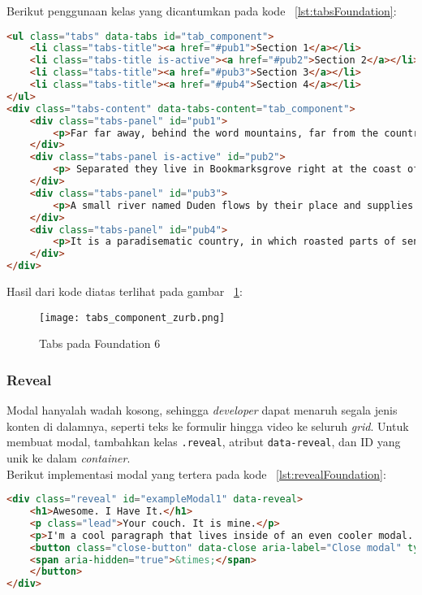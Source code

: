 \noindent Berikut penggunaan kelas yang dicantumkan pada kode ~\ref{lst:tabsFoundation}:
\begin{lstlisting}[style=customhtml, language=HTML,  basicstyle=\ttfamily, frame=single, columns=fullflexible, keepspaces=true, breaklines=true, showstringspaces=false, label={lst:tabsFoundation}, caption=Tabs pada foundation 6.] 
<ul class="tabs" data-tabs id="tab_component">
	<li class="tabs-title"><a href="#pub1">Section 1</a></li>
	<li class="tabs-title is-active"><a href="#pub2">Section 2</a></li>
	<li class="tabs-title"><a href="#pub3">Section 3</a></li>
	<li class="tabs-title"><a href="#pub4">Section 4</a></li>
</ul>
<div class="tabs-content" data-tabs-content="tab_component">
	<div class="tabs-panel" id="pub1">
		<p>Far far away, behind the word mountains, far from the countries Vokalia and Consonantia, there live the blind texts.</p>
	</div>
	<div class="tabs-panel is-active" id="pub2">
		<p> Separated they live in Bookmarksgrove right at the coast of the	Semantics, a large language ocean. </p>
	</div>
	<div class="tabs-panel" id="pub3">
		<p>A small river named Duden flows by their place and supplies it with the necessary regelialia.</p>
	</div>
	<div class="tabs-panel" id="pub4">
		<p>It is a paradisematic country, in which roasted parts of sentences fly into your mouth. </p>
	</div>
</div>
\end{lstlisting}

\noindent Hasil dari kode diatas terlihat pada gambar ~\ref{fig:tabsFoundation}:
\begin{figure} [H]
	\centering  
	\texttt{[image: tabs\_component\_zurb.png]}  
	\caption{Tabs pada Foundation 6}
	\label{fig:tabsFoundation}
\end{figure}

\subsubsection{Reveal}
Modal hanyalah wadah kosong, sehingga \textit{developer} dapat menaruh segala jenis konten di dalamnya, seperti teks ke formulir hingga video ke seluruh \textit{grid}.
Untuk membuat modal, tambahkan kelas \texttt{.reveal}, atribut \texttt{data-reveal}, dan ID yang unik ke dalam \textit{container}.
\\
\noindent Berikut implementasi modal yang tertera pada kode ~\ref{lst:revealFoundation}:

\begin{lstlisting}[style=customhtml, language=HTML,  basicstyle=\ttfamily, frame=single, columns=fullflexible, keepspaces=true, breaklines=true, showstringspaces=false, label={lst:revealFoundation}, caption=Reveal pada foundation 6.]  
<div class="reveal" id="exampleModal1" data-reveal>
	<h1>Awesome. I Have It.</h1>
	<p class="lead">Your couch. It is mine.</p>
	<p>I'm a cool paragraph that lives inside of an even cooler modal. Wins!</p>
	<button class="close-button" data-close aria-label="Close modal" type="button">
	<span aria-hidden="true">&times;</span>
	</button>
</div>
\end{lstlisting} 

